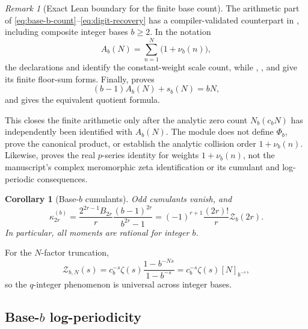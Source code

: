 \documentclass[11pt,oneside]{article}
\newtheorem{corollary}[theorem]{Corollary}
\theoremstyle{definition}
\theoremstyle{remark}
\newtheorem{remark}[theorem]{Remark}
\begin{document}
\begin{remark}[Exact Lean boundary for the finite base count]
The arithmetic part of \eqref{eq:base-b-count}--\eqref{eq:digit-recovery}
has a compiler-validated counterpart in
, including composite integer bases
\(b\geq2\).  In the notation
\[
 A_b(N)=\sum_{n=1}^{N}\bigl(1+\nu_b(n)\bigr),
\]
the declarations
 and
 identify the constant-weight
scale count, while
,
, and
 give its finite floor-sum
forms.  Finally,
 proves
\[
 (b-1)A_b(N)+s_b(N)=bN,
\]
and  gives the
equivalent quotient formula.

This closes the finite arithmetic only after the analytic zero count
\(N_b(c_bN)\) has independently been identified with \(A_b(N)\).  The
module does not define \(\Phi_b\), prove the canonical product, or establish
the analytic collision order \(1+\nu_b(n)\).  Likewise,
 proves the real \(p\)-series identity for
weights \(1+\nu_b(n)\), not the manuscript's complex meromorphic zeta
identification or its cumulant and log-periodic consequences.
\end{remark}

\begin{corollary}[Base-\(b\) cumulants]
Odd cumulants vanish, and
\begin{equation}
 \kappa_{2r}^{(b)}
 =
 \frac{2^{2r-1}B_{2r}}r
 \frac{(b-1)^{2r}}{b^{2r}-1}
 =
 (-1)^{r+1}\frac{(2r)!}{r}\mathcal Z_b(2r).
 \label{eq:base-b-cumulants}
\end{equation}
In particular, all moments are rational for integer \(b\).
\end{corollary}

For the \(N\)-factor truncation,
\begin{equation}
 \mathcal Z_{b,N}(s)
 =c_b^{-s}\zeta(s)
  \frac{1-b^{-Ns}}{1-b^{-s}}
 =c_b^{-s}\zeta(s)[N]_{b^{-s}},
 \label{eq:base-b-qinteger}
\end{equation}
so the \(q\)-integer phenomenon is universal across integer bases.

\subsection{Base-\(b\) log-periodicity}
\end{document}
